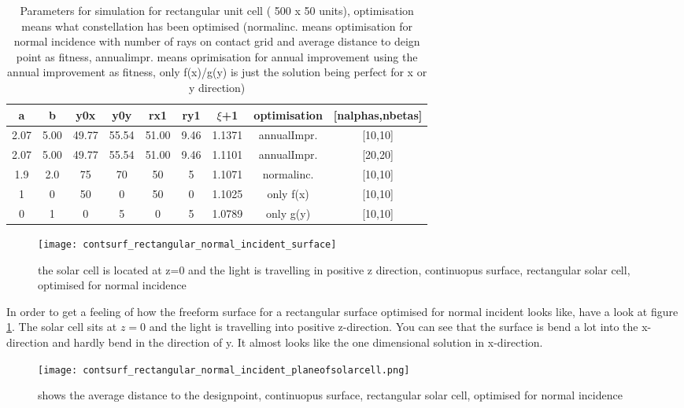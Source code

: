 \begin{table}[h]
\centering
\caption{Parameters for simulation for rectangular unit cell ( 500 x 50 units), optimisation means what constellation has been optimised (normalinc. means optimisation for normal incidence with number of rays on contact grid and average distance to deign point as fitness, annualimpr. means oprimisation for annual improvement using the annual improvement as fitness, only f(x)/g(y) is just the solution being perfect for x or y direction)}
\label{_table_rectangular_cell}
\begin{tabular}{c|c|c|c|c|c|c|c|c}
a & b & y0x & y0y & rx1 & ry1 & $\xi$+1 & optimisation & [nalphas,nbetas] \\
\hline\hline
2.07 & 5.00 & 49.77 & 55.54 & 51.00 & 9.46 & 1.1371 & annualImpr. & [10,10] \\
2.07 & 5.00 & 49.77 & 55.54 & 51.00 & 9.46 & 1.1101 & annualImpr. & [20,20] \\
1.9 & 2.0 & 75 & 70 & 50 & 5 & 1.1071 & normalinc. & [10,10] \\
1 & 0 & 50 & 0 & 50 & 0 & 1.1025 & only f(x) & [10,10] \\
0 & 1 & 0 & 5 & 0 & 5 & 1.0789 & only g(y) &[10,10]
\end{tabular}
\end{table}

\begin{figure}[h]
\centering
\texttt{[image: contsurf\_rectangular\_normal\_incident\_surface]}
\caption{the solar cell is located at z=0 and the light is travelling in positive z direction, continuopus surface, rectangular solar cell, optimised for normal incidence \label{contsurf_rectangular_normal_incident_surface}}
\end{figure}

In order to get a feeling of how the freeform surface for a rectangular surface optimised for normal incident looks like, have a look at figure \ref{contsurf_rectangular_normal_incident_surface}. The solar cell sits at $z=0$ and the light is travelling into positive z-direction. You can see that the surface is bend a lot into the x-direction and hardly bend in the direction of y. It almost looks like the one dimensional solution in x-direction. 


\begin{figure}[h]
\centering
\texttt{[image: contsurf\_rectangular\_normal\_incident\_planeofsolarcell.png]}
\caption{shows the average distance to the designpoint, continuopus surface, rectangular solar cell, optimised for normal incidence \label{contsurf_rectangular_normal_incident_planeofsolarcell}}
\end{figure}

